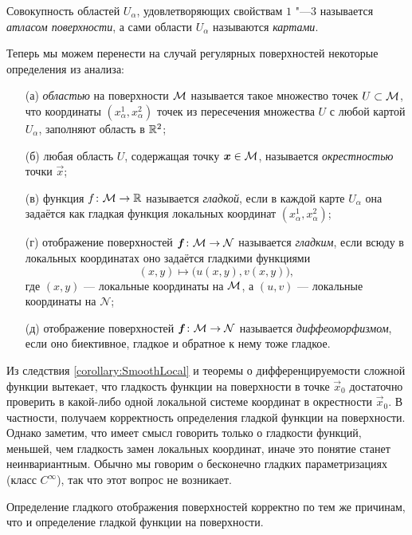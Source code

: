 \begin{definition}
	Совокупность областей $U_\alpha$, удовлетворяющих свойствам $1$ "---$3$ называется \textit{атласом поверхности}, а сами области $U_\alpha$ называются \textit{картами}.
\end{definition}

Теперь мы можем перенести на случай регулярных поверхностей некоторые определения из анализа:

\begin{enumerate}[nolistsep]
	\item[(а)] \textit{областью} на поверхности $\mathcal{M}$ называется такое множество точек $U \subset \mathcal{M}$, что координаты $(x_\alpha^1, x_\alpha^2)$ точек из пересечения множества $U$ с любой картой $U_\alpha$, заполняют область в $\mathbb{R}^2$;
	\item[(б)] любая область $U$, содержащая точку $\boldsymbol{x} \in \mathcal{M}$, называется \textit{окрестностью} точки $\vec{x}$;
	\item[(в)] функция $f\colon \mathcal{M} \to \mathbb{R}$ называется \textit{гладкой}, если в каждой карте $U_\alpha$ она задаётся как гладкая функция локальных координат $(x_\alpha^1, x_\alpha^2)$;
	\item[(г)] отображение поверхностей $\boldsymbol{f}\colon \mathcal{M} \to \mathcal{N}$ называется \textit{гладким}, если всюду в локальных координатах оно задаётся гладкими функциями
		\[
			(x, y) \mapsto \big(u(x, y), v(x, y)\big),
		\]
		где $(x, y)$ --- локальные координаты на $\mathcal{M}$, а $(u, v)$ --- локальные координаты на $\mathcal{N}$;
	\item[(д)] отображение поверхностей $\boldsymbol{f}\colon \mathcal{M} \to \mathcal{N}$ называется \textit{диффеоморфизмом}, если оно биективное, гладкое и обратное к нему тоже гладкое.
\end{enumerate}

Из следствия \ref{corollary:SmoothLocal} и теоремы о дифференцируемости сложной функции вытекает, что гладкость функции на поверхности в точке $\vec{x}_0$ достаточно проверить в какой-либо одной локальной системе координат в окрестности $\vec{x}_0$. В частности, получаем корректность определения гладкой функции на поверхности. Однако заметим, что имеет смысл говорить только о гладкости функций, меньшей, чем гладкость замен локальных координат, иначе это понятие станет неинвариантным. Обычно мы говорим о бесконечно гладких параметризациях (класс $C^\infty$), так что этот вопрос не возникает.

Определение гладкого отображения поверхностей корректно по тем же причинам, что и определение гладкой функции на поверхности.

